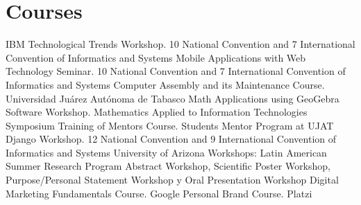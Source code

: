 \documentclass[]{friggeri-cv}
\begin{document}
\section{Courses}
\begin{entrylist}
          {IBM Technological Trends Workshop.}
          {10 National Convention and 7 International Convention of Informatics and Systems}
          {}
          {Mobile Applications with Web Technology Seminar.}
          {10 National Convention and 7 International Convention of Informatics and Systems}
          {}
          {Computer Assembly and its Maintenance Course.}
          {Universidad Ju\'{a}rez Aut\'{o}noma de Tabasco}
          {}
          {Math Applications using GeoGebra Software Workshop.}
          {Mathematics Applied to Information Technologies Symposium}
          {}
          {Training of Mentors Course.}
          {Students Mentor Program at UJAT}
          {}
          {Django Workshop.}
          {12 National Convention and 9 International Convention of Informatics and Systems}
          {}
          {University of Arizona Workshops:}
          {Latin American Summer Research Program}
          {Abstract Workshop, Scientific Poster Workshop, Purpose/Personal Statement Workshop y Oral Presentation Workshop}
          {Digital Marketing Fundamentals Course.}
          {Google}
          {}
          {Personal Brand Course.}
          {Platzi}
          {}
\end{entrylist}
\newline
\newline
\newline
\newline
\newline
\newline
\newline
\newline
\newline
\newline
\newline
\newline
\newline
\newline
\newline
\newline
\newline
\newline
\newline
\newline
\end{document}
